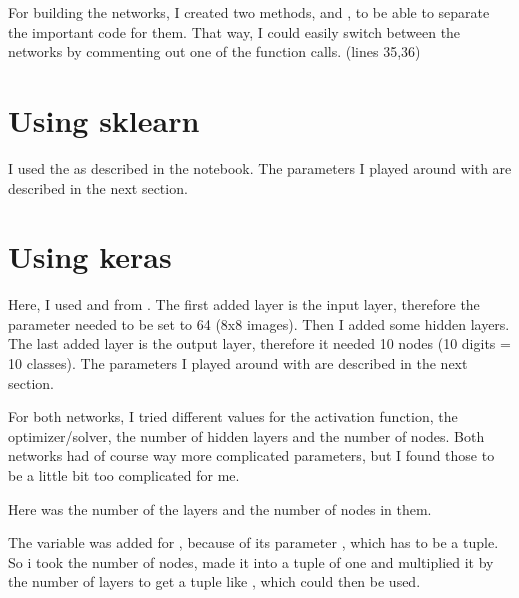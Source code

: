 	
	\task[]

	For building the networks, I created two methods,  and , to be able to separate the important code for them. That way, I could easily switch between the networks by commenting out one of the function calls. (lines 35,36)
	
	
	
	\section{Using sklearn}
	
	I used the  as described in the notebook. The parameters I played around with are described in the next section.
	
	
	\section{Using keras}
	
	Here, I used  and  from . The first added layer is the input layer, therefore the  parameter needed to be set to 64 (8x8 images). Then I added some hidden layers. The last added layer is the output layer, therefore it needed 10 nodes (10 digits = 10 classes). The parameters I played around with are described in the next section.
	
	
	\task[]
	
	For both networks, I tried different values for the activation function, the optimizer/solver, the number of hidden layers and the number of nodes. Both networks had of course way more complicated parameters, but I found those to be a little bit too complicated for me.
	
	
	Here  was the number of the layers and  the number of nodes in them. 
	
	The  variable was added for , because of its parameter , which has to be a tuple. So i took the number of nodes, made it into a tuple of one  and multiplied it by the number of layers to get a tuple like , which could then be used. 
	
